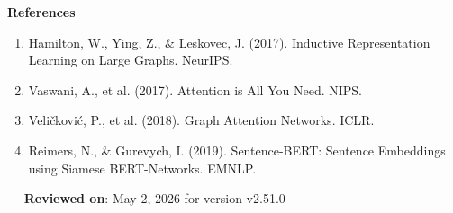 \textbf{References}
\begin{enumerate}
\item Hamilton, W., Ying, Z., \& Leskovec, J. (2017). Inductive Repres\-entation Learning on Large Graphs. NeurIPS.
\item Vaswani, A., et al. (2017). Attention is All You Need. NIPS.
\item Veličković, P., et al. (2018). Graph Attention Networks. ICLR.
\item Reimers, N., \& Gurevych, I. (2019). Sentence-BERT: Sentence Embeddings using Siamese BERT-Networks. EMNLP.

\end{enumerate}
---
\textbf{Reviewed on}: May 2, 2026 for version v2.51.0
